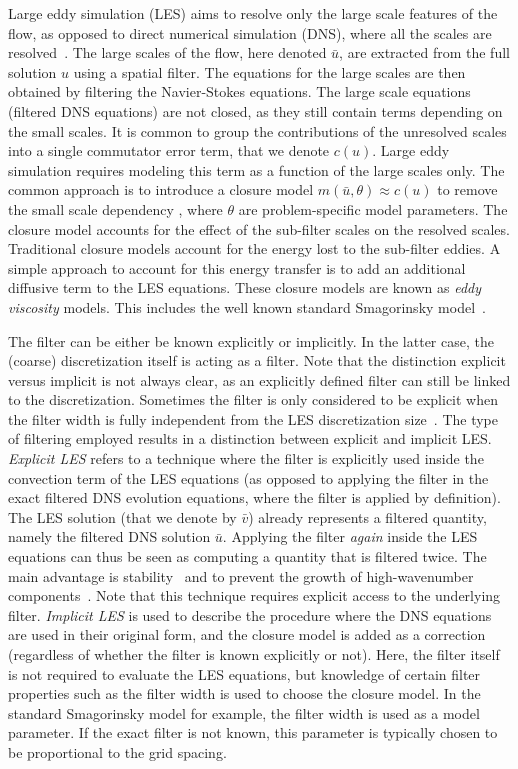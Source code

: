\documentclass[preprint]{elsarticle}
\begin{document}
Large eddy simulation (LES) aims to resolve only the large scale features of the
flow, as opposed to direct numerical simulation (DNS), where all the scales are
resolved~\cite{Pope2000,Berselli2006}. The large scales of the flow, here
denoted $\bar{u}$, are extracted from the full solution $u$ using a spatial
filter. The equations for the large scales are then obtained by filtering the
Navier-Stokes equations. The large scale equations (filtered DNS equations) are
not closed, as they still contain terms depending on the small scales. It is
common to group the contributions of the unresolved scales into a single
commutator error term, that we denote $c(u)$. Large eddy simulation
requires modeling this term as a function of the large scales only. The common
approach is to introduce a closure model $m(\bar{u}, \theta) \approx c(u)$
to remove the small scale dependency
\cite{Pope2000,Sagaut2005,Berselli2006}, where $\theta$ are problem-specific
model parameters. The closure model accounts for the effect of the sub-filter
scales on the resolved scales. Traditional closure models account for the energy
lost to the sub-filter eddies. A simple approach to account for this energy
transfer is to add an additional diffusive term to the LES equations. These
closure models are known as \emph{eddy viscosity} models. This includes the well
known standard Smagorinsky model~\cite{Smagorinsky1963,Lilly1962,Lilly1967}.

The filter can be either be known explicitly or implicitly. In the latter case,
the (coarse) discretization itself is acting as a filter. Note that the
distinction explicit versus implicit is not always clear, as an explicitly
defined filter can still be linked to the discretization. Sometimes the filter
is only considered to be explicit when the filter width is fully independent
from the LES discretization size~\cite{Beck2023}. The type of filtering employed
results in a distinction between explicit and implicit LES. \emph{Explicit LES}
\cite{Lund2003,Gallagher2019a,Gallagher2019b} refers to a technique where the
filter is explicitly used inside the convection term of the LES equations (as
opposed to applying the filter in the exact filtered DNS evolution equations,
where the filter is applied by definition). The LES solution (that we denote by
$\bar{v}$) already represents a filtered quantity, namely the filtered DNS
solution $\bar{u}$. Applying the filter \emph{again} inside the LES equations
can thus be seen as computing a quantity that is filtered twice. The main
advantage is stability~\cite{Benjamin2023b} and to prevent the growth of
high-wavenumber components~\cite{Lund2003,Gallagher2019a}. Note that this
technique requires explicit access to the underlying filter. \emph{Implicit LES}
is used to describe the procedure where the DNS equations are used in their
original form, and the closure model is added as a correction (regardless of
whether the filter is known explicitly or not). Here, the filter itself is not
required to evaluate the LES equations, but knowledge of certain filter
properties such as the filter width is used to choose the closure model. In the
standard Smagorinsky model for example, the filter width is used as a model
parameter. If the exact filter is not known, this parameter is typically chosen
to be proportional to the grid spacing.
\end{document}
